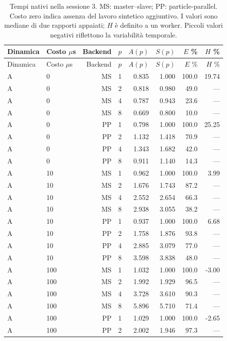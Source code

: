 \small
\begin{longtable}{@{}llrrrrrr@{}}
\caption{Tempi nativi nella sessione 3. MS: master--slave; PP: particle-parallel. Costo zero indica assenza del lavoro sintetico aggiuntivo. I valori sono mediane di due rapporti appaiati; $H$ è definito a un worker. Piccoli valori negativi riflettono la variabilità temporale.}\label{tab:parallel-full}\\
\toprule Dinamica & Costo $\mu$s & Backend & $p$ & $A(p)$ & $S(p)$ & $E$ \% & $H$ \%\\\midrule\endfirsthead
\toprule Dinamica & Costo $\mu$s & Backend & $p$ & $A(p)$ & $S(p)$ & $E$ \% & $H$ \%\\\midrule\endhead
\bottomrule\endfoot
A & 0 & MS & 1 & 0.835 & 1.000 & 100.0 & 19.74\\
A & 0 & MS & 2 & 0.818 & 0.980 & 49.0 & ---\\
A & 0 & MS & 4 & 0.787 & 0.943 & 23.6 & ---\\
A & 0 & MS & 8 & 0.669 & 0.800 & 10.0 & ---\\
A & 0 & PP & 1 & 0.798 & 1.000 & 100.0 & 25.25\\
A & 0 & PP & 2 & 1.132 & 1.418 & 70.9 & ---\\
A & 0 & PP & 4 & 1.343 & 1.682 & 42.0 & ---\\
A & 0 & PP & 8 & 0.911 & 1.140 & 14.3 & ---\\
A & 10 & MS & 1 & 0.962 & 1.000 & 100.0 & 3.99\\
A & 10 & MS & 2 & 1.676 & 1.743 & 87.2 & ---\\
A & 10 & MS & 4 & 2.552 & 2.654 & 66.3 & ---\\
A & 10 & MS & 8 & 2.938 & 3.055 & 38.2 & ---\\
A & 10 & PP & 1 & 0.937 & 1.000 & 100.0 & 6.68\\
A & 10 & PP & 2 & 1.758 & 1.876 & 93.8 & ---\\
A & 10 & PP & 4 & 2.885 & 3.079 & 77.0 & ---\\
A & 10 & PP & 8 & 3.598 & 3.838 & 48.0 & ---\\
A & 100 & MS & 1 & 1.032 & 1.000 & 100.0 & -3.00\\
A & 100 & MS & 2 & 1.992 & 1.929 & 96.5 & ---\\
A & 100 & MS & 4 & 3.728 & 3.610 & 90.3 & ---\\
A & 100 & MS & 8 & 5.896 & 5.710 & 71.4 & ---\\
A & 100 & PP & 1 & 1.029 & 1.000 & 100.0 & -2.65\\
A & 100 & PP & 2 & 2.002 & 1.946 & 97.3 & ---\\

\end{longtable}
